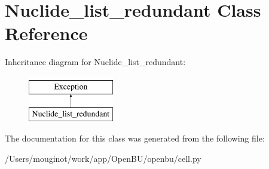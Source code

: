 \hypertarget{classopenbu_1_1cell_1_1_nuclide__list__redundant}{}\section{Nuclide\+\_\+list\+\_\+redundant Class Reference}
\label{classopenbu_1_1cell_1_1_nuclide__list__redundant}
Inheritance diagram for Nuclide\+\_\+list\+\_\+redundant\+:\begin{figure}[H]
\begin{center}
\leavevmode
\includegraphics[height=2.000000cm]{classopenbu_1_1cell_1_1_nuclide__list__redundant}
\end{center}
\end{figure}


The documentation for this class was generated from the following file\+:\begin{DoxyCompactItemize}
\item 
/\+Users/mouginot/work/app/\+Open\+B\+U/openbu/cell.\+py\end{DoxyCompactItemize}
